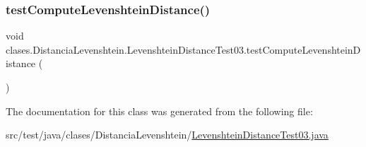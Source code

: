 \subsubsection{\texorpdfstring{test\+Compute\+Levenshtein\+Distance()}{testComputeLevenshteinDistance()}}
{\footnotesize\ttfamily void clases.\+Distancia\+Levenshtein.\+Levenshtein\+Distance\+Test03.\+test\+Compute\+Levenshtein\+Distance (\begin{DoxyParamCaption}{ }\end{DoxyParamCaption})}



The documentation for this class was generated from the following file\+:\begin{DoxyCompactItemize}
\item 
src/test/java/clases/\+Distancia\+Levenshtein/\hyperlink{_levenshtein_distance_test03_8java}{Levenshtein\+Distance\+Test03.\+java}\end{DoxyCompactItemize}
